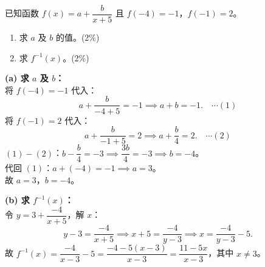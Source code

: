 \documentclass[12pt,a4paper]{exam-zh}
\begin{document}


{\bfseries \requiredgrouptitle\par}
\vspace{0.8em}

\begin{question}
    已知函数 $f(x) = a + \dfrac{b}{x+5}$ 且 $f(-4) = -1$，$f(-1) = 2$。
    \begin{enumerate}[label=(\alph*)]
        \item 求 $a$ 及 $b$ 的值。\hfill(2\%)
        \item 求 $f^{-1}(x)$。\hfill(2\%)
    \end{enumerate}
\end{question}

\begin{solution}
    \textbf{(a) 求 $a$ 及 $b$：} \\
    将 $f(-4) = -1$ 代入：
    \[
        a + \frac{b}{-4+5} = -1 \implies a + b = -1. \quad \cdots (1)
    \]
    将 $f(-1) = 2$ 代入：
    \[
        a + \frac{b}{-1+5} = 2 \implies a + \frac{b}{4} = 2. \quad \cdots (2)
    \]
    $(1) - (2)$：$b - \dfrac{b}{4} = -3 \implies \dfrac{3b}{4} = -3 \implies b = -4$。 \\
    代回 $(1)$：$a + (-4) = -1 \implies a = 3$。 \\
    故 $a = 3$，$b = -4$。

    \textbf{(b) 求 $f^{-1}(x)$：} \\
    令 $y = 3 + \dfrac{-4}{x+5}$，解 $x$：
    \[
        y - 3 = \frac{-4}{x+5} \implies x + 5 = \frac{-4}{y-3} \implies x = \frac{-4}{y-3} - 5.
    \]
    故 $f^{-1}(x) = \dfrac{-4}{x-3} - 5 = \dfrac{-4 - 5(x-3)}{x-3} = \dfrac{11-5x}{x-3}$，其中 $x \ne 3$。
\end{solution}
\end{document}
